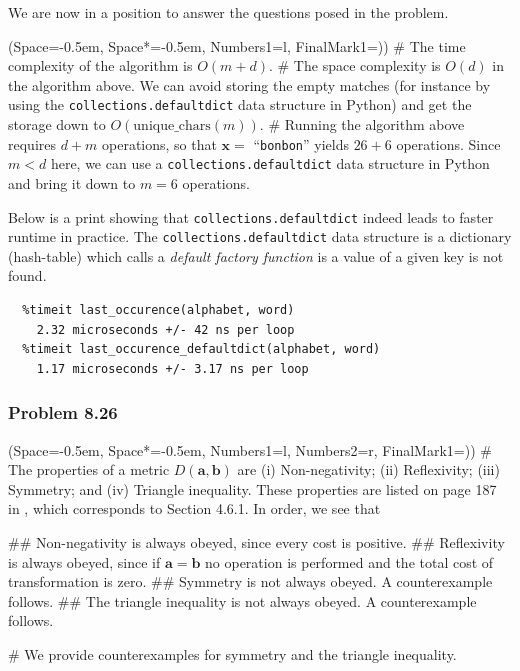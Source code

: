 \documentclass[12pt, a4paper]{article}
\newcommand{\listSpace}{-0.5em}%
\newcommand{\vect}[1]{\bm{#1}}
\begin{document}
{We are now in a position to answer the questions posed in the problem.
\begin{easylist}[enumerate]
	\ListProperties(Space=\listSpace, Space*=\listSpace, Numbers1=l, FinalMark1={)})
	# The time complexity of the algorithm is $O(m + d)$.
	# The space complexity is $O(d)$ in the algorithm above. We can avoid storing the empty matches (for instance by using the \texttt{collections.defaultdict} data structure in Python) and get the storage down to $O( \text{unique\_chars}(m))$.
	# Running the algorithm above requires $d + m$ operations, so that $\vect{x}=$ ``\texttt{bonbon}'' yields $26 + 6$ operations.
	Since $m < d$ here, we can use a \texttt{collections.defaultdict} data structure in Python and bring it down to $m = 6$ operations.
\end{easylist}
Below is a print showing that \texttt{collections.defaultdict} indeed leads to faster runtime in practice.
The \texttt{collections.defaultdict} data structure is a dictionary (hash-table) which calls a \emph{default factory function} is a value of a given key is not found.
\begin{Verbatim}
  %timeit last_occurence(alphabet, word)
    2.32 microseconds +/- 42 ns per loop
  %timeit last_occurence_defaultdict(alphabet, word)
    1.17 microseconds +/- 3.17 ns per loop
\end{Verbatim}


\subsubsection*{Problem 8.26}
\begin{easylist}[enumerate]
\ListProperties(Space=\listSpace, Space*=\listSpace, Numbers1=l, Numbers2=r, FinalMark1={)})
# The properties of a metric $D(\vect{a}, \vect{b})$ are
(i) Non-negativity; 
(ii) Reflexivity; 
(iii) Symmetry; and 
(iv) Triangle inequality. These properties are listed on page 187 in \cite{duda_pattern_2000}, which corresponds to Section 4.6.1.
In order, we see that
\begin{easylist}
	## Non-negativity is always obeyed, since every cost is positive.
	## Reflexivity is always obeyed, since if $\vect{a} = \vect{b}$ no operation is performed and the total cost of transformation is zero.
	## Symmetry is not always obeyed. A counterexample follows.
	## The triangle inequality is not always obeyed. A counterexample follows.
\end{easylist}

# We provide counterexamples for symmetry and the triangle inequality.


\end{easylist}}
\end{document}

